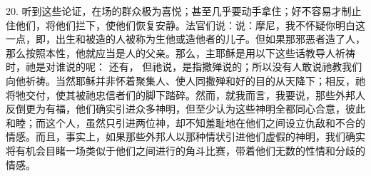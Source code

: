 20. 听到这些论证，在场的群众极为喜悦；甚至几乎要动手拿住；好不容易才制止住他们，将他们拦下，使他们恢复安静。法官们说：说：摩尼，我不怀疑你明白这一点，即，出生和被造的人被称为生他或造他者的儿子。但如果那邪恶者造了人，那么按照本性，他就应当是人的父亲。那么，主耶稣是用以下这些话教导人祈祷时，祂是对谁说的呢： 还有， 但祂说，是指撒殚说的；所以没有人敢说祂教我们向他祈祷。当然耶稣并非怀着聚集人、使人同撒殚和好的目的从天降下；相反，祂将牠交付，使其被祂忠信者们的脚下踏碎。然而，就我而言，我要说，那些外邦人反倒更为有福，他们确实引进众多神明，但至少认为这些神明全都同心合意，彼此和睦；而这个人，虽然只引进两位神，却不知羞耻地在他们之间设立仇敌和不合的情感。而且，事实上，如果那些外邦人以那种情状引进他们虚假的神明，我们确实将有机会目睹一场类似于他们之间进行的角斗比赛，带着他们无数的性情和分歧的情感。\par

